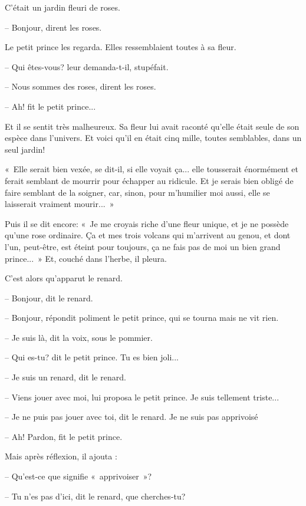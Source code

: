 \documentclass[a4paper]{report}
\begin{document}
C'était un jardin fleuri de roses.

-- Bonjour, dirent les roses.

Le petit prince les regarda. Elles ressemblaient toutes à sa fleur.

-- Qui êtes-vous? leur demanda-t-il, stupéfait.

-- Nous sommes des roses, dirent les roses.

-- Ah! fit le petit prince...

Et il se sentit très malheureux. Sa fleur lui avait raconté qu'elle était seule de son espèce dans l'univers. Et voici qu'il en était cinq mille, toutes semblables, dans un seul jardin!


«~Elle serait bien vexée, se dit-il, si elle voyait ça... elle tousserait énormément et ferait semblant de mourrir pour échapper au ridicule. Et je serais bien obligé de faire semblant de la soigner, car, sinon, pour m'humilier moi aussi, elle se laisserait vraiment mourir...~»

Puis il se dit encore: «~Je me croyais riche d'une fleur unique, et je ne possède qu'une rose ordinaire. Ça et mes trois volcans qui m'arrivent au genou, et dont l'un, peut-être, est éteint pour toujours, ça ne fais pas de moi un bien grand prince...~» Et, couché dans l'herbe, il pleura. 


\parachapter{} %
C'est alors qu'apparut le renard.

-- Bonjour, dit le renard.

-- Bonjour, répondit poliment le petit prince, qui se tourna mais ne vit rien.

-- Je suis là, dit la voix, sous le pommier.

-- Qui es-tu? dit le petit prince. Tu es bien joli...


-- Je suis un renard, dit le renard.

-- Viens jouer avec moi, lui proposa le petit prince. Je suis tellement triste...

-- Je ne puis pas jouer avec toi, dit le renard. Je ne suis pas apprivoisé

-- Ah! Pardon, fit le petit prince.

Mais après réflexion, il ajouta :

-- Qu'est-ce que signifie «~apprivoiser~»?

-- Tu n'es pas d'ici, dit le renard, que cherches-tu?
\end{document}
